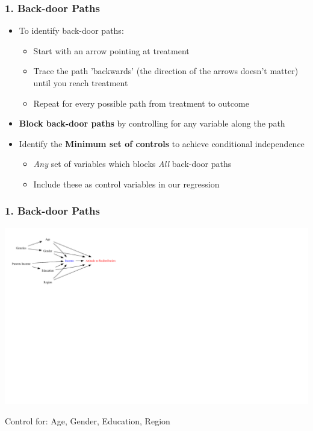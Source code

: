 \documentclass[xcolor=x11names,compress]{beamer}\usepackage[]{graphicx}\usepackage[]{color}
\newenvironment{knitrout}{}{} %
\renewcommand{\(}{\begin{columns}}
\renewcommand{\)}{\end{columns}}
\newcommand{\<}[1]{\begin{column}{#1}}
\renewcommand{\>}{\end{column}}
\begin{document}
\begin{frame}
\frametitle{1. Back-door Paths}
\begin{itemize}
\item To identify back-door paths:
\pause
\begin{itemize}
\item Start with an arrow pointing at treatment
\pause
\item Trace the path 'backwards' (the direction of the arrows doesn't matter) until you reach treatment
\pause
\item Repeat for every possible path from treatment to outcome
\pause
\end{itemize}
\item \textbf{Block back-door paths} by controlling for any variable along the path
\pause
\item Identify the \textbf{Minimum set of controls} to achieve conditional independence
\pause
\begin{itemize}
\item \textit{Any} set of variables which blocks \textit{All} back-door paths
\pause
\item Include these as control variables in our regression
\end{itemize}
\end{itemize}
\end{frame}

\begin{frame}
\frametitle{1. Back-door Paths}
\begin{knitrout}
\color{fgcolor}
\includegraphics[width=2.7\linewidth]{figure/Dag4_paths_b-1} 

\end{knitrout}
\pause
Control for: Age, Gender, Education, Region
\end{frame}
\end{document}
